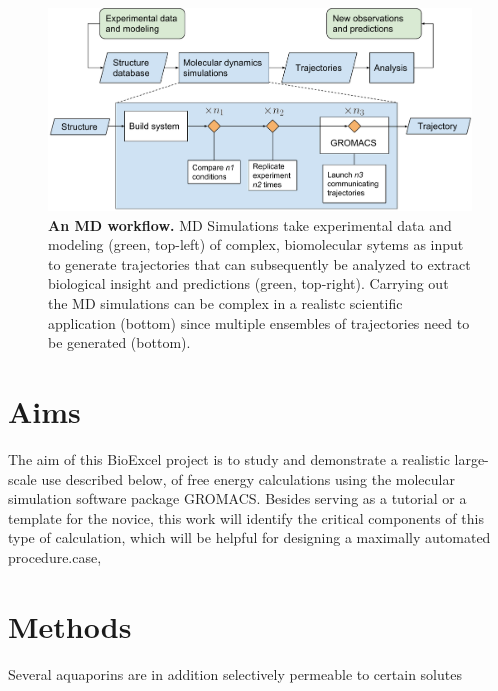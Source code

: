 \documentclass[11pt,a4paper]{article}
\begin{document}
\begin{figure}[thbp!]
\includegraphics[width=1\textwidth]{figs/md-workflow.pdf}
\caption{\label{fig:mdworkflow}
\textbf{An MD workflow.} 
MD Simulations take experimental data and modeling (green, top-left) of complex, biomolecular sytems as input to generate trajectories that can subsequently be analyzed to extract biological insight and predictions (green, top-right). Carrying out the MD simulations can be complex in a realistc scientific application (bottom) since multiple ensembles of trajectories need to be generated (bottom). 
}
\end{figure}

\section{Aims}
 The aim of this BioExcel project is to study and demonstrate a realistic large-scale use described below, of free energy calculations using the molecular simulation software package GROMACS. Besides serving as a tutorial or a template for the novice, this work will identify the critical components of this type of calculation, which will be helpful for designing a maximally automated procedure.case, 
\section{Methods}
Several aquaporins are in addition selectively permeable to certain solutes 
\end{document}
